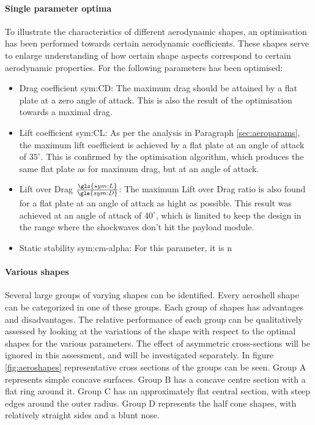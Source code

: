 \paragraph{Single parameter optima} \label{sec:aerooptima}
To illustrate the characteristics of different aerodynamic shapes, an optimisation has been performed towards certain aerodynamic coefficients. These shapes serve to enlarge understanding of how certain shape aspects correspond to certain aerodynamic properties. For the following parameters has been optimised:
\begin{itemize}
	\item Drag coefficient \gls{sym:CD}: The maximum drag should be attained by a flat plate at a zero angle of attack. This is also the result of the optimisation towards a maximal drag.
	\item Lift coefficient \gls{sym:CL}: As per the analysis in Paragraph \ref{sec:aeroparams}, the maximum lift coefficient is achieved by a flat plate at an angle of attack of $35^\circ$. This is confirmed by the optimisation algorithm, which produces the same flat plate as for maximum drag, but at an angle of attack.
	\item Lift over Drag $\frac{\gls{sym:L}}{\gls{sym:D}}$: The maximum Lift over Drag ratio is also found for a flat plate at an angle of attack as hight as possible. This result was achieved at an angle of attack of $40^\circ$, which is limited to keep the design in the range where the shockwaves don't hit the payload module.
	\item Static stability \gls{sym:cm-alpha}: For this parameter, it is n
\end{itemize}

\paragraph{Various shapes} \label{sec:aeroshapes}
Several large groups of varying shapes can be identified. Every aeroshell shape can be categorized in one of these groups.  Each group of shapes has advantages and disadvantages. The relative performance of each group can be qualitatively assessed by looking at the variations of the shape with respect to the optimal shapes for the various parameters. The effect of asymmetric cross-sections will be ignored in this assessment, and will be investigated separately. In figure \ref{fig:aeroshapes} representative cross sections of the groups can be seen. Group A represents simple concave surfaces. Group B has a concave centre section with a flat ring around it. Group C has an approximately flat central section, with steep edges around the outer radius. Group D represents the half cone shapes, with relatively straight sides and a blunt nose. 

